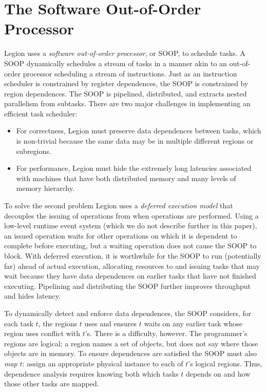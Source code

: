 \section{The Software Out-of-Order Processor}
\label{sec:soop}

Legion uses a {\em  software out-of-order processor}, or SOOP, to schedule tasks.  A SOOP 
dynamically schedules a stream of tasks in a manner akin to an out-of-order processor scheduling a stream of instructions.
Just as an instruction scheduler is constrained by register dependences,
the SOOP is constrained by region dependences.
The SOOP  is pipelined, distributed, and extracts nested parallelism from subtasks.
There are two major challenges in implementing an efficient task scheduler:
\begin{itemize}
\item  For correctness, Legion must preserve data dependences between tasks, which is non-trivial
because the same data may be in multiple different regions or subregions.
  
\item For performance, Legion must hide the extremely long latencies associated
  with machines that have both distributed memory and many levels of
  memory hierarchy.
\end{itemize}

To solve the second problem Legion uses a {\em deferred execution model} that decouples the issuing
of operations from when operations are performed.  Using a low-level runtime event system (which we do
not describe further in this paper), an issued operation waits for other operations on
which it is dependent to complete before executing, but a waiting operation does not cause the SOOP
to block.  With deferred execution, it is worthwhile for the SOOP to run (potentially far) ahead of actual execution,
allocating resources to and issuing tasks that may wait because they have data dependences on earlier tasks that have not 
finished executing.   Pipelining and distributing the SOOP further improves throughput and hides latency.

To dynamically detect and enforce data dependences,
the SOOP considers, for each task $t$, the
regions $t$ uses and ensures $t$ waits on any
earlier task whose region uses conflict with $t$'s.  There is a
difficulty, however.  The programmer's regions are logical; a region
names a set of objects, but does not say where those objects
are in memory.  To ensure dependences are satisfied the SOOP must also {\em map} $t$: assign an
appropriate physical instance to each of $t$'s logical regions.  Thus, dependence
analysis requires knowing both which tasks $t$ depends on and how those
other tasks are mapped.

